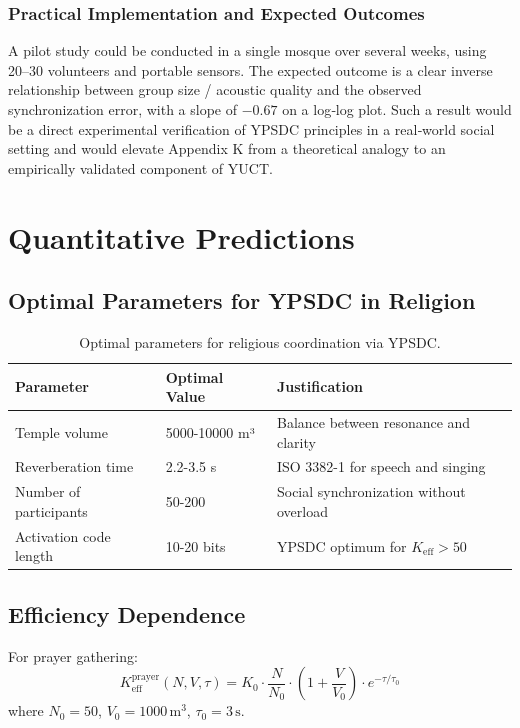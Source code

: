 \documentclass[12pt,a4paper]{article}
\begin{document}
	\subsubsection{Practical Implementation and Expected Outcomes}
	A pilot study could be conducted in a single mosque over several weeks, using 20–30 volunteers and portable sensors. The expected outcome is a clear inverse relationship between group size / acoustic quality and the observed synchronization error, with a slope of \(-0.67\) on a log‑log plot. Such a result would be a direct experimental verification of YPSDC principles in a real‑world social setting and would elevate Appendix K from a theoretical analogy to an empirically validated component of YUCT.
	
	\section{Quantitative Predictions}
	
	\subsection{Optimal Parameters for YPSDC in Religion}
	
	\begin{table}[h]
		\centering
		\begin{tabular}{p{}p{}p{}}
			\toprule
			\textbf{Parameter} & \textbf{Optimal Value} & \textbf{Justification} \\
			\midrule
			Temple volume & 5000-10000 m³ & Balance between resonance and clarity \\
			Reverberation time & 2.2-3.5 s & ISO 3382-1 for speech and singing \\
			Number of participants & 50-200 & Social synchronization without overload \\
			Activation code length & 10-20 bits & YPSDC optimum for $K_{\mathrm{eff}} > 50$ \\
			\bottomrule
		\end{tabular}
		\caption{Optimal parameters for religious coordination via YPSDC.}
		\label{tab:optimal-params}
	\end{table}
	
	\subsection{Efficiency Dependence}
	
	For prayer gathering:
	\[
	K_{\mathrm{eff}}^{\mathrm{prayer}}(N, V, \tau) = K_0 \cdot \frac{N}{N_0} \cdot \left(1 + \frac{V}{V_0}\right) \cdot e^{-\tau/\tau_0}
	\]
	where $N_0 = 50$, $V_0 = 1000 \, \mathrm{m}^3$, $\tau_0 = 3 \, \mathrm{s}$.
	
\end{document}
